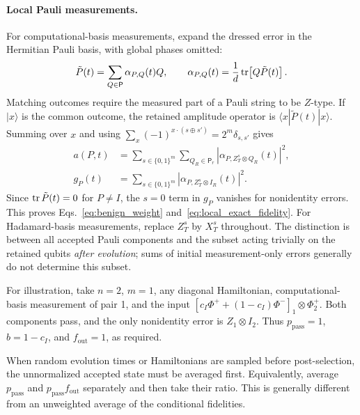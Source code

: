 \documentclass[onecolumn,prx,longbibliography,nofootinbib, superscriptaddress]{revtex4-2}
\theoremstyle{recap}
\begin{document}
\paragraph{Local Pauli measurements.}
For computational-basis measurements, expand the dressed error in the Hermitian Pauli basis, with global phases omitted:
\begin{equation}
    \tilde P(t)=\sum_{Q\in\mathsf P}\alpha_{P,Q}(t)Q,\qquad
    \alpha_{P,Q}(t)=\frac{1}{d}\tr\!\left[Q\tilde P(t)\right].
\end{equation}
Matching outcomes require the measured part of a Pauli string to be $Z$-type. If $|x\rangle$ is the common outcome, the retained amplitude operator is $\langle x|\tilde P(t)|x\rangle$. Summing over $x$ and using
$\sum_x(-1)^{x\cdot(s\oplus s')}=2^m\delta_{s,s'}$ gives
\begin{equation}\label{eq:pauli_good_and_pass}
\begin{split}
    a(P,t)&=\sum_{s\in\{0,1\}^m}\sum_{Q_R\in\mathsf P_r}
        \left|\alpha_{P,Z_T^s\otimes Q_R}(t)\right|^2,\\
    g_P(t)&=\sum_{s\in\{0,1\}^m}
        \left|\alpha_{P,Z_T^s\otimes I_R}(t)\right|^2.
\end{split}
\end{equation}
Since $\tr\tilde P(t)=0$ for $P\neq I$, the $s=0$ term in $g_P$ vanishes for nonidentity errors. This proves Eqs.~\eqref{eq:benign_weight} and~\eqref{eq:local_exact_fidelity}. For Hadamard-basis measurements, replace $Z_T^s$ by $X_T^s$ throughout. The distinction is between all accepted Pauli components and the subset acting trivially on the retained qubits \emph{after evolution}; sums of initial measurement-only errors generally do not determine this subset.

For illustration, take $n=2$, $m=1$, any diagonal Hamiltonian, computational-basis measurement of pair 1, and the input $[c_I\Phi^++(1-c_I)\Phi^-]_1\otimes\Phi^+_2$. Both components pass, and the only nonidentity error is $Z_1\otimes I_2$. Thus $p_{\mathrm{pass}}=1$, $b=1-c_I$, and $f_{\mathrm{out}}=1$, as required.

When random evolution times or Hamiltonians are sampled before post-selection, the unnormalized accepted state must be averaged first. Equivalently, average $p_{\mathrm{pass}}$ and $p_{\mathrm{pass}}f_{\mathrm{out}}$ separately and then take their ratio. This is generally different from an unweighted average of the conditional fidelities.
\end{document}
